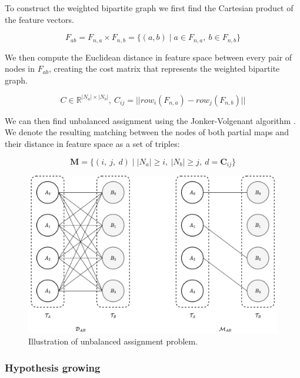 To construct the weighted bipartite graph we first find the Cartesian product of the feature vectors.

\begin{equation}
    \label{eq:E_ab}
    F_{ab} = F_{n,a} \times F_{n,b} = \{(a,b) \mid a \in F_{n,a},\ b \in F_{n,b}\}
\end{equation}

We then compute the Euclidean distance in feature space between every pair of nodes in \(F_{ab}\), creating the cost matrix that represents the weighted bipartite graph.

\begin{equation}
    \label{eq:C}
    C \in \mathbb{R}^{|N_a| \times |N_b|},\ C_{ij} = ||row_i(F_{n,a}) - row_j(F_{n,b})||
\end{equation}


We can then find unbalanced assignment using the Jonker-Volgenant algorithm \citep{jonker_shortest_1987}. We denote the resulting matching between the nodes of both partial maps and their distance in feature space as a set of triples:

\begin{equation}
    \label{eq:M}
    \mathbf{M} = \{(i,\ j,\ d) \mid  |N_a| \geq i,\ |N_b|\geq j,\ d = \mathbf{C}_{ij}\}
\end{equation}

\begin{figure}[h]
    \centering
    \includegraphics*[width=.9\textwidth]{./fig/assignment.drawio.pdf}
    \caption{Illustration of unbalanced assignment problem.}
    \label{fig:assignment}
\end{figure}

\subsubsection{Hypothesis growing}

